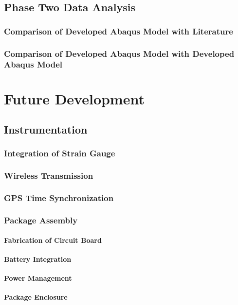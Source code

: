 \documentclass[12pt]{report}
\begin{document}
	\section{Phase Two Data Analysis}
		\subsection{Comparison of Developed Abaqus Model with Literature}
		\subsection{Comparison of Developed Abaqus Model with Developed Abaqus Model}	
		
\chapter{Future Development}
	\section{Instrumentation}
		\subsection{Integration of Strain Gauge}
			
		\subsection{Wireless Transmission}
		\subsection{GPS Time Synchronization}
		\subsection{Package Assembly}
			\subsubsection{Fabrication of Circuit Board}
			\subsubsection{Battery Integration}
			\subsubsection{Power Management}
			\subsubsection{Package Enclosure}
				
\end{document}
